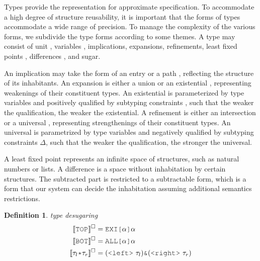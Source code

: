 \documentclass[table,dvipsnames,acmsmall]{acmart}
\theoremstyle{definition}
\newtheorem{definition}{Definition}[section]
\begin{document}
\noindent
Types provide the representation for approximate specification.
To accommodate a high degree of structure reusability,
it is important that the forms of types accommodate a wide range of precision.
To manage the complexity of the various forms, we subdivide the type forms
according to some themes.
A type \ms{\tau} may consist of unit , variables \ms{\alpha}, 
implications, expansions, refinements,
least fixed points ,
differences \ms{\tau \typdiff \eta}, and sugar.


An implication \ms{\kappa} may take the form of  
an entry  or a path \ms{\tau \J{->} \tau},
reflecting the structure of its inhabitants.
An expansion \ms{\phi} is either a union \ms{\tau \J{|} \tau} or 
an existential ,
representing weakenings of their constituent types. 
An existential is parameterized by type variables \ms{\Theta}
and positively qualified by subtyping constraints \ms{\Delta}, 
such that the weaker the qualification, the weaker the existential.
A refinement \ms{\psi} is either an intersection \ms{\tau \J{\&} \tau} or 
a universal ,
representing strengthenings of their constituent types. 
An universal is parametrized by type variables \ms{\Theta} 
and negatively qualified by subtyping constraints $\Delta$,
such that the weaker the qualification, the stronger the universal.


A least fixed point 
represents an infinite space of structures, 
such as natural numbers or lists. 
A difference \ms{\tau \typdiff \eta} is a space without inhabitation by certain structures.
The subtracted part is restricted to a subtractable form,
which is a form that our system can decide the inhabitation
assuming additional semantics restrictions.


\begin{definition} 
  \label{def:type_desugaring}
  \emph{type desugaring}
  \hfill 
  \small
  \boxed{\llbracket \gamma \rrbracket^\square = \tau}
  \nopad
  \begin{align*}
    \llbracket \J{TOP} \rrbracket^\square &= \J{EXI[} \alpha \J{]} \alpha
    \\
    \llbracket \J{BOT} \rrbracket^\square &= \J{ALL[} \alpha \J{]} \alpha
    \\
    \llbracket \tau_l \J{*} \tau_r \rrbracket^\square &= (\J{<left>}\ \tau_l)  \J{\&} (\J{<right>}\ \tau_r)
  \end{align*}
\end{definition} 
\end{document}

